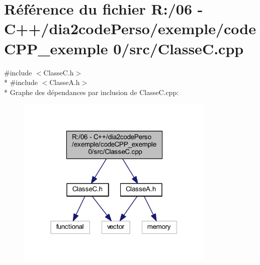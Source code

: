 \section{Référence du fichier R\+:/06 -\/ C++/dia2code\+Perso/exemple/code\+C\+P\+P\+\_\+exemple 0/src/\+Classe\+C.cpp}
\label{_classe_c_8cpp}
{\ttfamily \#include $<$Classe\+C.\+h$>$}\\*
{\ttfamily \#include $<$Classe\+A.\+h$>$}\\*
Graphe des dépendances par inclusion de Classe\+C.\+cpp\+:\nopagebreak
\begin{figure}[H]
\begin{center}
\leavevmode
\includegraphics[width=268pt]{_classe_c_8cpp__incl}
\end{center}
\end{figure}
